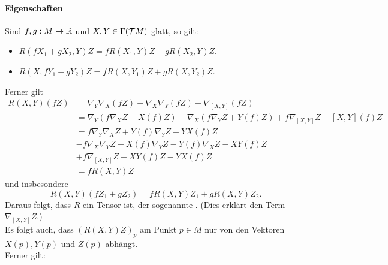 \paragraph{Eigenschaften}
Sind $f,g : M \overset{}{\rightarrow} \mathbb{R}$ und $X,Y \in \Gamma(\mathcal{T} M)$ glatt, so gilt:
\begin{itemize}
	\item $R(fX_1+gX_2,Y)Z = fR(X_1,Y)Z + gR(X_2,Y)Z$.
	\item $R(X, fY_1 + gY_2)Z = fR(X,Y_1)Z + gR(X,Y_2)Z$.
\end{itemize}
Ferner gilt
\begin{align*}
R(X,Y)(fZ) &= \nabla_Y \nabla_{X} (fZ) - \nabla_{X} \nabla_{Y} (fZ) + \nabla_{[X,Y]} (fZ)\\
&= \nabla_{Y}( f\nabla_{X} Z + X(f)Z) - \nabla_{X}(f\nabla_{Y} Z + Y(f)Z) + f\nabla_{[X,Y]} Z + [X,Y](f) Z\\
&=f \nabla_{Y} \nabla_{X} Z + Y(f) \nabla_{Y} Z + YX(f) Z\\
&- f\nabla_{X} \nabla_{Y} Z - X(f) \nabla_{Y} Z - Y(f) \nabla_{X} Z - XY(f)Z \\
&+ f\nabla_{[X,Y]} Z + XY(f) Z -YX(f)Z\\
&= f R(X,Y)Z
\end{align*}
und insbesondere
\[ R(X,Y)(fZ_1 + gZ_2) = f R(X,Y) Z_1 + g R(X,Y)Z_2.  \]
Daraus folgt, dass $R$ ein Tensor ist, der sogenannte . (Dies erklärt den Term $\nabla_{[X,Y]}Z$.)\\
Es folgt auch, dass $(R(X,Y)Z)_p$ am Punkt $p \in M$ nur von den Vektoren $X(p), Y(p)$ und $Z(p)$ abhängt.\\
Ferner gilt:
\label{SymmetrienRiemannscherKrümmungstensor}
